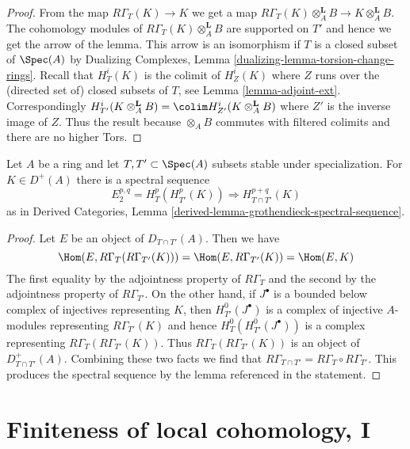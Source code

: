 \begin{proof}
From the map $R\Gamma_T(K) \to K$ we get a map
$R\Gamma_T(K) \otimes_A^\mathbf{L} B \to K \otimes_A^\mathbf{L} B$.
The cohomology modules of $R\Gamma_T(K) \otimes_A^\mathbf{L} B$
are supported on $T'$ and hence we get the arrow of the lemma.
This arrow is an isomorphism if $T$ is a closed subset of $\Spec(A)$ by
Dualizing Complexes, Lemma \ref{dualizing-lemma-torsion-change-rings}.
Recall that $H^i_T(K)$ is the colimit of $H^i_Z(K)$ where $Z$ runs over
the (directed set of) closed subsets of $T$, see
Lemma \ref{lemma-adjoint-ext}.
Correspondingly
$H^i_{T'}(K \otimes_A^\mathbf{L} B) =
\colim H^i_{Z'}(K \otimes_A^\mathbf{L} B)$ where $Z'$ is the inverse
image of $Z$. Thus the result because $\otimes_A B$ commutes
with filtered colimits and there are no higher Tors.
\end{proof}

\begin{lemma}
\label{lemma-local-cohomology-ss}
Let $A$ be a ring and let $T, T' \subset \Spec(A)$ subsets
stable under specialization. For $K \in D^+(A)$
there is a spectral sequence
$$
E_2^{p, q} = H^p_T(H^p_{T'}(K)) \Rightarrow H^{p + q}_{T \cap T'}(K)
$$
as in Derived Categories, Lemma
\ref{derived-lemma-grothendieck-spectral-sequence}.
\end{lemma}

\begin{proof}
Let $E$ be an object of $D_{T \cap T'}(A)$. Then we have
$$
\Hom(E, R\Gamma_T(R\Gamma_{T'}(K))) =
\Hom(E, R\Gamma_{T'}(K)) =
\Hom(E, K)
$$
The first equality by the adjointness property of $R\Gamma_T$
and the second by the adjointness property of $R\Gamma_{T'}$.
On the other hand, if $J^\bullet$ is a bounded below complex
of injectives representing $K$, then $H^0_{T'}(J^\bullet)$
is a complex of injective $A$-modules representing $R\Gamma_{T'}(K)$
and hence $H^0_T(H^0_{T'}(J^\bullet))$ is a complex representing
$R\Gamma_T(R\Gamma_{T'}(K))$. Thus $R\Gamma_T(R\Gamma_{T'}(K))$
is an object of $D^+_{T \cap T'}(A)$. Combining these two
facts we find that $R\Gamma_{T \cap T'} = R\Gamma_T \circ R\Gamma_{T'}$.
This produces the spectral sequence by the lemma referenced
in the statement.
\end{proof}








\section{Finiteness of local cohomology, I}
\label{section-finiteness}

